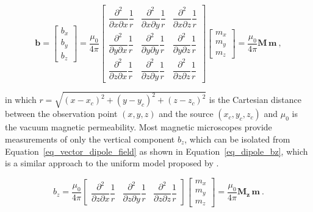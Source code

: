 \begin{equation}
\label{eq_vector_dipole_field}
\mathbf{b}
=
\begin{bmatrix}
  b_x \\ b_y \\ b_z
\end{bmatrix}
= \dfrac{\mu_0}{4\pi}
\begin{bmatrix}
    \dfrac{\partial^2}{\partial x \partial x} \dfrac{1}{r}
  & \dfrac{\partial^2}{\partial x \partial y} \dfrac{1}{r}
  & \dfrac{\partial^2}{\partial x \partial z} \dfrac{1}{r}
  \\
    \dfrac{\partial^2}{\partial y \partial x} \dfrac{1}{r}
  & \dfrac{\partial^2}{\partial y \partial y} \dfrac{1}{r}
  & \dfrac{\partial^2}{\partial y \partial z} \dfrac{1}{r}
  \\
  \dfrac{\partial^2}{\partial z \partial x} \dfrac{1}{r}
  & \dfrac{\partial^2}{\partial z \partial y} \dfrac{1}{r}
  & \dfrac{\partial^2}{\partial z \partial z} \dfrac{1}{r}
\end{bmatrix}
\begin{bmatrix}
  m_x \\ m_y \\ m_z
\end{bmatrix}
= \dfrac{\mu_0}{4\pi} \mathbf{M}\,\mathbf{m}
\ ,
\end{equation}

\noindent
in which $r = \sqrt{(x - x_c)^2 + (y - y_c)^2 + (z - z_c)^2}$ is the Cartesian distance between the observation point $(x, y, z)$ and the source $(x_c, y_c, z_c)$ and $\mu_0$ is the vacuum magnetic permeability. Most magnetic microscopes provide measurements of only the vertical component $b_z$, which can be isolated from Equation~\ref{eq_vector_dipole_field} as shown in Equation~\ref{eq_dipole_bz}, which is a similar approach to the uniform model proposed by \cite{Weiss2007}.

\begin{equation}
\label{eq_dipole_bz}
b_z
= \dfrac{\mu_0}{4\pi}
\begin{bmatrix}
\dfrac{\partial^2}{\partial z \partial x} \dfrac{1}{r}
& \dfrac{\partial^2}{\partial z \partial y} \dfrac{1}{r}
& \dfrac{\partial^2}{\partial z \partial z} \dfrac{1}{r}
\end{bmatrix}
\begin{bmatrix}
m_x \\ m_y \\ m_z
\end{bmatrix}
= \dfrac{\mu_0}{4\pi} \mathbf{M_z}\,\mathbf{m}
\ .
\end{equation}

